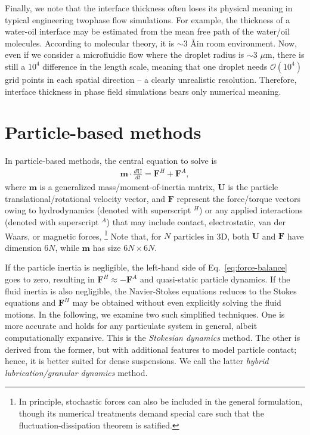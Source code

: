 Finally, we note that the interface thickness often loses its physical meaning in typical engineering twophase flow simulations. 
For example, the thickness of a water-oil interface may be estimated from the mean free path of the water/oil molecules. According to molecular theory, it is $\sim 3$ \AA \enspace in room environment. Now, even if we consider a microfluidic flow where the droplet radius is $\sim 3$ $\mu$m, there is still a $10^{4}$ difference in the length scale, meaning that one droplet needs $\mathcal{O}(10^{4})$ grid points in each spatial direction -- a clearly unrealistic resolution.
Therefore, interface thickness in phase field simulations bears only numerical meaning.


\section{Particle-based methods}
\label{sec:num-dem}

In particle-based methods, the central equation to solve is
\begin{equation} 
 \begin{aligned} \label{eq:force-balance}
  {\bm m} \cdot \frac{d{\bm U}}{dt} = {\bm F}^H + {\bm F}^A, 
 \end{aligned}
\end{equation}
where ${\bm m}$ is a generalized mass/moment-of-inertia matrix,
${\bm U}$ is the particle translational/rotational velocity vector,
and ${\bm F}$ represent the force/torque vectors owing to hydrodynamics (denoted with superscript $^H$) or any applied interactions (denoted with superscript $^A$) that may include contact, electrostatic, van der Waars, or magnetic forces, \etc \footnote{In principle, stochastic forces can also be included in the general formulation, though its numerical treatments demand special care such that the fluctuation-dissipation theorem is satified.}
Note that, for $N$ particles in 3D, both ${\bm U}$ and ${\bm F}$ have dimension $6N$, while ${\bm m}$ has size $6N \times 6N$.

If the particle inertia is negligible, the left-hand side of Eq.\ \eqref{eq:force-balance} goes to zero, resulting in $\bm{F}^H \approx -\bm{F}^A$ and quasi-static particle dynamics.
If the fluid inertia is also negligible, the Navier-Stokes equations reduces to the Stokes equations and $\bm{F}^H$ may be obtained without even explicitly solving the fluid motions.
In the following, we examine two such simplified techniques.
One is more accurate and holds for any particulate system in general, albeit computationally expansive. This is the \emph{Stokesian dynamics} method.
The other is derived from the former, but with additional features to model particle contact; hence, it is better suited for dense suspensions. We call the latter \emph{hybrid lubrication/granular dynamics} method.

